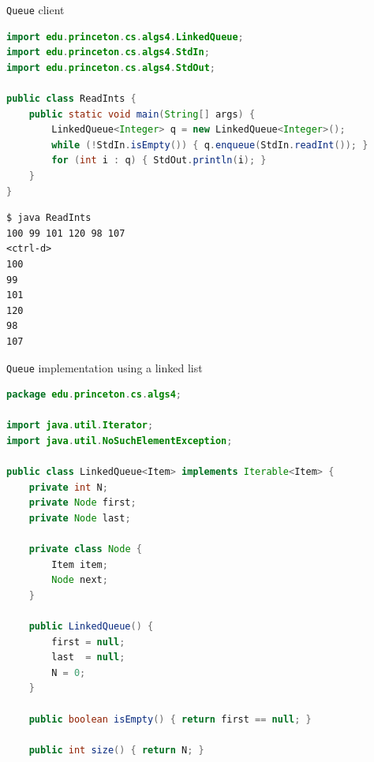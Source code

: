 \documentclass[8pt,a4paper,compress]{beamer}
\begin{document}
\begin{frame}[fragile]
\pause

\lstinline{Queue} client

\smallskip

\begin{lstlisting}[language=Java,style=focusin]
import edu.princeton.cs.algs4.LinkedQueue;
import edu.princeton.cs.algs4.StdIn;
import edu.princeton.cs.algs4.StdOut;

public class ReadInts {
    public static void main(String[] args) {
        LinkedQueue<Integer> q = new LinkedQueue<Integer>();
        while (!StdIn.isEmpty()) { q.enqueue(StdIn.readInt()); }
        for (int i : q) { StdOut.println(i); }
    }
}
\end{lstlisting}

\pause\bigskip

\begin{lstlisting}[language={},style=focusin]
$ java ReadInts
100 99 101 120 98 107
<ctrl-d>
100
99
101
120
98
107
\end{lstlisting}
\end{frame}

\begin{frame}[fragile]
\pause

\lstinline{Queue} implementation using a linked list

\smallskip

\begin{lstlisting}[language=Java,style=focusin]
package edu.princeton.cs.algs4;

import java.util.Iterator;
import java.util.NoSuchElementException;

public class LinkedQueue<Item> implements Iterable<Item> {
    private int N; 
    private Node first; 
    private Node last; 

    private class Node {
        Item item;
        Node next;
    }

    public LinkedQueue() {
        first = null;
        last  = null;
        N = 0;
    }

    public boolean isEmpty() { return first == null; }

    public int size() { return N; }
\end{lstlisting}
\end{frame}
\end{document}
